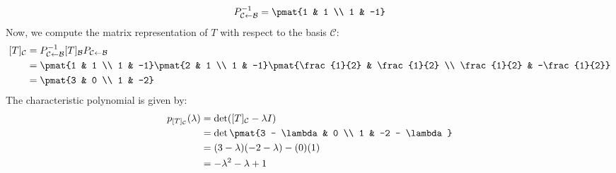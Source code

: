 \documentclass[openany]{book}
\begin{document}
\begin{example}
    $$P_{\mathcal{C} \leftarrow \mathcal{B}}^{-1} = \pmat{1 & 1 \\ 1 & -1}$$
    Now, we compute the matrix representation of $T$ with respect to the basis $\mathcal{C}$:
    \[\begin{aligned}
    [T]_{\mathcal{C}} &= P_{\mathcal{C} \leftarrow \mathcal{B}}^{-1} [T]_{\mathcal{B}} P_{\mathcal{C} \leftarrow \mathcal{B}} \\
    &= \pmat{1 & 1 \\ 1 & -1} \pmat{2 & 1 \\ 1 & -1} \pmat{\frac{1}{2} & \frac{1}{2} \\ \frac{1}{2} & -\frac{1}{2}} \\
    &= \pmat{3 & 0 \\ 1 & -2}
    \end{aligned}\]
    The characteristic polynomial is given by:
    \[\begin{aligned}
    p_{[T]_{\mathcal{C}}}(\lambda) &= \det([T]_{\mathcal{C}} - \lambda I) \\
    &= \det\pmat{3 - \lambda & 0 \\ 1 & -2 - \lambda} \\
    &= (3 - \lambda)(-2 - \lambda) - (0)(1) \\
    &= -\lambda^2 - \lambda + 1
    \end{aligned}\]
\end{example}
\end{document}
